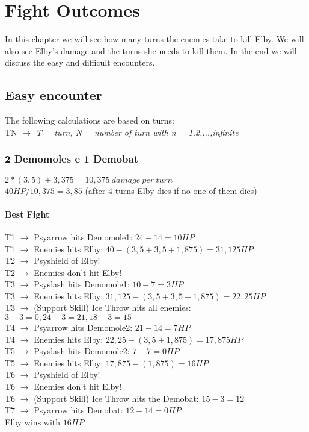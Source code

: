 \section{Fight Outcomes}
\label{fights}
In this chapter we will see how many turns the enemies take to kill Elby. We will also see Elby's damage and the turns she needs to kill them. In the end we will discuss the easy and difficult encounters.

\subsection{Easy encounter}
The following calculations are based on turns:\\

TN $\rightarrow$ \textit{T = turn, N = number of turn with n = {1,2,...,infinite}}

\subsubsection*{2 Demomoles e 1 Demobat}
$2*(3,5)+3,375 = 10,375\:damage\:per\:turn$ \\
$40 HP/10,375 =3,85$ (after 4 turns Elby dies if no one of them dies)\\

\paragraph*{Best Fight\\}
T1 $\rightarrow$ Psyarrow hits Demomole1: $24-14 = 10 HP$\\
T1 $\rightarrow$ Enemies hits Elby: $40 - (3,5+3,5+1,875) = 31,125 HP$\\
T2 $\rightarrow$ Psyshield of Elby!\\
T2 $\rightarrow$ Enemies don’t hit Elby!\\
T3 $\rightarrow$ Psyslash hits Demomole1: $10 - 7 = 3 HP$\\
T3 $\rightarrow$ Enemies hits Elby: $31,125 - (3,5+3,5+1,875) = 22,25 HP$\\
T3 $\rightarrow$ (Support Skill) Ice Throw hits all enemies: $3 - 3 = 0, 24 - 3 = 21, 18 - 3 = 15$\\
T4 $\rightarrow$ Psyarrow hits Demomole2: $21-14 = 7 HP$\\
T4 $\rightarrow$ Enemies hits Elby: $22,25 - (3,5+1,875) = 17,875 HP$\\
T5 $\rightarrow$ Psyslash hits Demomole2: $7 - 7 = 0 HP$\\
T5 $\rightarrow$ Enemies hits Elby: $17,875 - (1,875) = 16 HP$\\
T6 $\rightarrow$ Psyshield of Elby!\\
T6 $\rightarrow$ Enemies don’t hit Elby!\\
T6 $\rightarrow$ (Support Skill) Ice Throw hits the Demobat: $15 - 3 = 12$\\
T7 $\rightarrow$ Psyarrow hits Demobat: $12-14 = 0 HP$\\
Elby wins with $16 HP$


